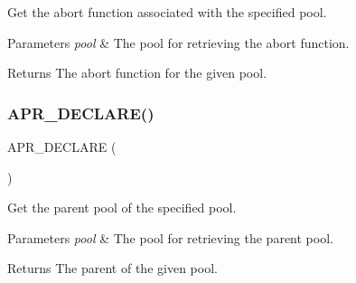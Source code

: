 Get the abort function associated with the specified pool. 
\begin{DoxyParams}{Parameters}
{\em pool} & The pool for retrieving the abort function. \\
\hline
\end{DoxyParams}
\begin{DoxyReturn}{Returns}
The abort function for the given pool. 
\end{DoxyReturn}
\mbox{\label{group__apr__pools_ga514eba9e7f17bad2eb7a034c5b65352e}} 
\subsubsection{\texorpdfstring{A\+P\+R\+\_\+\+D\+E\+C\+L\+A\+R\+E()}{APR\_DECLARE()}\hspace{0.1cm}{\footnotesize\ttfamily [6/6]}}
{\footnotesize\ttfamily A\+P\+R\+\_\+\+D\+E\+C\+L\+A\+RE (\begin{DoxyParamCaption}\item[{\mbox{\hyperlink{group__apr__pools_gaf137f28edcf9a086cd6bc36c20d7cdfb}{apr\+\_\+pool\+\_\+t}} $\ast$}]{ }\end{DoxyParamCaption})}

Get the parent pool of the specified pool. 
\begin{DoxyParams}{Parameters}
{\em pool} & The pool for retrieving the parent pool. \\
\hline
\end{DoxyParams}
\begin{DoxyReturn}{Returns}
The parent of the given pool. 
\end{DoxyReturn}

